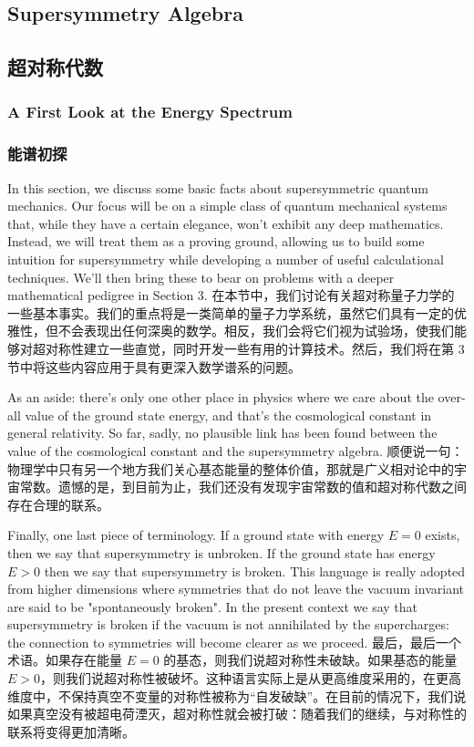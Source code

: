 \documentclass{ctexart}
\begin{document}
\begin{paracol}{2}
\subsection{Supersymmetry Algebra}
\switchcolumn
\subsection*{超对称代数}
\switchcolumn*

\subsubsection{A First Look at the Energy Spectrum}
\switchcolumn
\subsubsection*{能谱初探}
\switchcolumn*

In this section, we discuss some basic facts about supersymmetric quantum mechanics. Our focus will be on a simple class of quantum mechanical systems that, while they have a certain elegance, won't exhibit any deep mathematics. Instead, we will treat them as a proving ground, allowing us to build some intuition for supersymmetry while developing a number of useful calculational techniques. We'll then bring these to bear on problems with a deeper mathematical pedigree in Section 3.
\switchcolumn
在本节中，我们讨论有关超对称量子力学的一些基本事实。我们的重点将是一类简单的量子力学系统，虽然它们具有一定的优雅性，但不会表现出任何深奥的数学。相反，我们会将它们视为试验场，使我们能够对超对称性建立一些直觉，同时开发一些有用的计算技术。然后，我们将在第 3 节中将这些内容应用于具有更深入数学谱系的问题。
\switchcolumn*

As an aside: there's only one other place in physics where we care about the over- all value of the ground state energy, and that's the cosmological constant in general relativity. So far, sadly, no plausible link has been found between the value of the cosmological constant and the supersymmetry algebra.
\switchcolumn
顺便说一句：物理学中只有另一个地方我们关心基态能量的整体价值，那就是广义相对论中的宇宙常数。遗憾的是，到目前为止，我们还没有发现宇宙常数的值和超对称代数之间存在合理的联系。
\switchcolumn*

Finally, one last piece of terminology. If a ground state with energy $E = 0$ exists, then we say that supersymmetry is unbroken. If the ground state has energy $E > 0$ then we say that supersymmetry is broken. This language is really adopted from higher dimensions where symmetries that do not leave the vacuum invariant are said to be "spontaneously broken". In the present context we say that supersymmetry is broken if the vacuum is not annihilated by the supercharges: the connection to symmetries will become clearer as we proceed.
\switchcolumn
最后，最后一个术语。如果存在能量 $E = 0$ 的基态，则我们说超对称性未破缺。如果基态的能量 $E > 0$，则我们说超对称性被破坏。这种语言实际上是从更高维度采用的，在更高维度中，不保持真空不变量的对称性被称为“自发破缺”。在目前的情况下，我们说如果真空没有被超电荷湮灭，超对称性就会被打破：随着我们的继续，与对称性的联系将变得更加清晰。
\switchcolumn*


\end{paracol}
\end{document}
